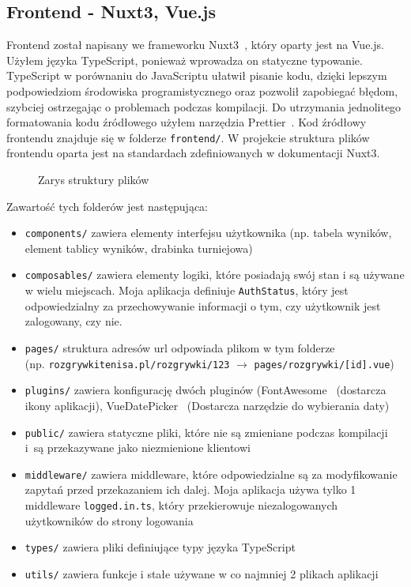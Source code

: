 \documentclass[shortabstract]{iithesis}
\begin{document}
\subsection{Frontend - Nuxt3, Vue.js}
Frontend został napisany we frameworku Nuxt3~\cite{Nuxt3}, który oparty jest na Vue.js.
Użyłem języka TypeScript, ponieważ wprowadza on statyczne typowanie.
TypeScript w porównaniu do JavaScriptu ułatwił pisanie kodu, dzięki lepszym podpowiedziom środowiska programistycznego oraz pozwolił zapobiegać błędom, szybciej ostrzegając o problemach podczas kompilacji.
Do utrzymania jednolitego formatowania kodu źródłowego użyłem narzędzia Prettier~\cite{Prettier}.
Kod źródłowy frontendu znajduje się w folderze \texttt{frontend/}. W projekcie struktura plików frontendu oparta jest na
standardach zdefiniowanych w dokumentacji Nuxt3.
\begin{figure}[H]
    \caption{Zarys struktury plików}
\end{figure}
\noindent
Zawartość tych folderów jest następująca:
\begin{itemize}
    \item \texttt{components/} zawiera elementy interfejsu użytkownika (np. tabela wyników, element tablicy wyników, drabinka turniejowa)
    \item \texttt{composables/} zawiera elementy logiki, które posiadają swój stan i są używane w wielu miejscach. Moja aplikacja definiuje \texttt{AuthStatus}, który jest odpowiedzialny za przechowywanie informacji o tym, czy użytkownik jest zalogowany, czy nie.
    \item \texttt{pages/} struktura adresów url odpowiada plikom w tym folderze\\(np. \texttt{rozgrywkitenisa.pl/rozgrywki/123} $\longrightarrow$ \texttt{pages/rozgrywki/[id].vue})
    \item \texttt{plugins/} zawiera konfigurację dwóch pluginów (FontAwesome~\cite{FontAwesome} (dostarcza ikony aplikacji), VueDatePicker~\cite{VueDatePicker} (Dostarcza narzędzie do wybierania daty)
    \item \texttt{public/} zawiera statyczne pliki, które nie są zmieniane podczas kompilacji i~są przekazywane jako niezmienione klientowi
    \item \texttt{middleware/} zawiera middleware, które odpowiedzialne są za modyfikowanie zapytań przed przekazaniem ich dalej. Moja aplikacja używa tylko 1 middleware \texttt{logged.in.ts}, który przekierowuje niezalogowanych użytkowników do strony logowania
    \item \texttt{types/} zawiera pliki definiujące typy języka TypeScript
    \item \texttt{utils/} zawiera funkcje i stałe używane w co najmniej 2 plikach aplikacji
\end{itemize}
\end{document}
